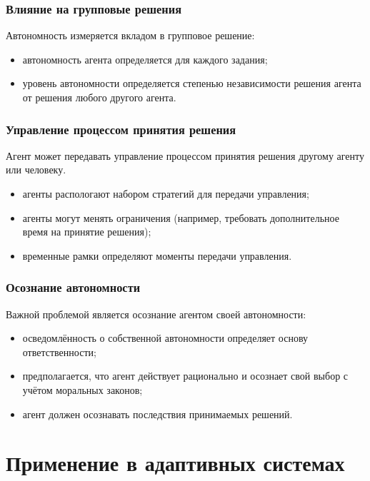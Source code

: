 \documentclass{beamer}
\begin{document}
\begin{frame}
  \frametitle{Влияние на групповые решения}
  Автономность измеряется вкладом в групповое решение:
  \begin{itemize}
    \item автономность агента определяется для каждого задания;
    \item уровень автономности определяется степенью независимости
      решения агента от решения любого другого агента.
  \end{itemize}
\end{frame}

\begin{frame}
  \frametitle{Управление процессом принятия решения}
  Агент может передавать управление процессом принятия решения другому агенту или человеку.
  \begin{itemize}
    \item агенты распологают набором стратегий для передачи управления;
    \item агенты могут менять ограничения (например,
      требовать дополнительное время на принятие решения);
    \item временные рамки определяют моменты передачи управления.
  \end{itemize}
\end{frame}

\begin{frame}
  \frametitle{Осознание автономности}
  Важной проблемой является осознание агентом своей автономности:
  \begin{itemize}
    \item осведомлённость о собственной автономности определяет основу ответственности;
    \item предполагается, что агент действует рационально и осознает свой выбор
      с учётом моральных законов;
    \item агент должен осознавать последствия принимаемых решений.
  \end{itemize}
\end{frame}

\section{Применение в адаптивных системах}
\end{document}

